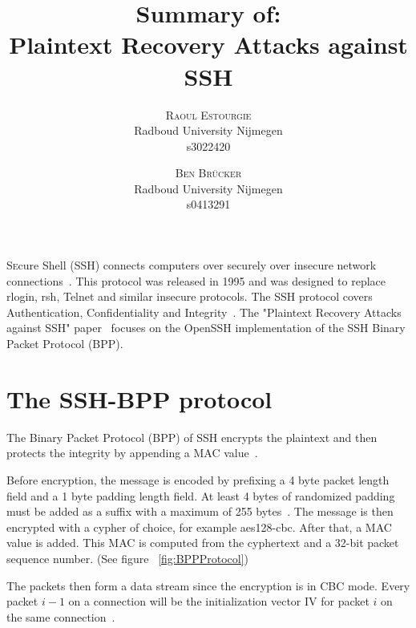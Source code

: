 \documentclass[twocolumn]{article}
\title{\vspace{-15mm}%
	\fontsize{24pt}{10pt}\selectfont
	\textbf{Summary of:\\Plaintext Recovery Attacks against SSH}
	}
\author{%
	\large
	\textsc{Raoul Estourgie} \\[2mm]
	\normalsize	Radboud University Nijmegen \\
	\normalsize	s3022420
	\vspace{-5mm}
	\and 
	\large
	\textsc{Ben Br\"ucker} \\[2mm]
	\normalsize	Radboud University Nijmegen \\
	\normalsize	s0413291
	\vspace{-5mm}
	}
\date{}
\begin{document}

\thispagestyle{fancy}

\lettrine[nindent=0em,lines=3]{S} ecure Shell (SSH) connects computers over securely over insecure network connections~\cite{Ylonen2006}. This protocol was released in 1995 and was designed to replace rlogin, rsh, Telnet and similar insecure protocols. 
\indent The SSH protocol covers Authentication, Confidentiality and Integrity~\cite{Barret2001}.
\indent The "Plaintext Recovery Attacks against SSH" paper~\cite{Albrecht2009} focuses on the OpenSSH implementation of the SSH Binary Packet Protocol (BPP).

\section{The SSH-BPP protocol}
\indent The Binary Packet Protocol (BPP) of SSH encrypts the plaintext and then protects the integrity by appending a MAC value~\cite{Ylonen2006}.

\indent Before encryption, the message is encoded by prefixing a 4 byte packet length field and a 1 byte padding length field. At least 4 bytes of randomized padding must be added as a suffix with a maximum of 255 bytes~\cite{Albrecht2009}. The message is then encrypted with a cypher of choice, for example aes128-cbc. After that, a MAC value is added. This MAC is computed from the cyphertext and a 32-bit packet sequence number. (See figure ~\ref{fig:BPPProtocol})

\indent The packets then form a data stream since the encryption is in CBC mode. Every packet $i-1$ on a connection will be the initialization vector IV for packet $i$ on the same connection~\cite{Albrecht2009}.
\end{document}
